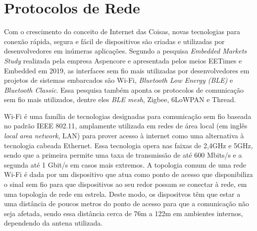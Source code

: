 \documentclass[../monografia.tex]{subfiles}
\begin{document}


\section{Protocolos de Rede} 

Com o crescimento do conceito de Internet das Coisas, novas tecnologias para conexão rápida, segura e fácil de dispositivos são criadas e utilizadas por desenvolvedores em inúmeras aplicações. Segundo a pesquisa \textit{Embedded Markets Study} realizada pela empresa Aspencore\cite{embedded-market-study} e apresentada pelos meios EETimes\cite{eetimes} e Embedded\cite{embedded} em 2019, as interfaces sem fio mais utilizadas por desenvolvedores em  projetos de sistemas embarcados são Wi-Fi, \textit{Bluetooth Low Energy (BLE)} e \textit{Bluetooth Classic}. Essa pesquisa também aponta os protocolos de comunicação sem fio mais utilizados, dentre eles \textit{BLE mesh}, Zigbee, 6LoWPAN e Thread. 

Wi-Fi é uma família de tecnologias designadas para comunicação sem fio baseada no padrão IEEE 802.11\cite{802.11}, amplamente utilizada em redes de área local (em inglês \textit{local area network}, LAN) para prover acesso à internet como uma alternativa à tecnologia cabeada Ethernet. Essa tecnologia opera nas faixas de 2,4GHz e 5GHz, sendo que a primeira permite uma taxa de transmissão de até 600 Mbits/s e a segunda até 1 Gbit/s em casos mais extremos\cite{Wi-Fi-datarate}. A topologia comum de uma rede Wi-Fi é dada por um  dispositivo que atua como ponto de acesso que disponibiliza o sinal sem fio para que dispositivos ao seu redor possam se conectar à rede, em uma topologia de rede em estrela. Deste modo, os dispositvos têm que estar a uma distância de poucos metros do ponto de acesso para que a comunicação não seja afetada, sendo essa distância cerca de 76m a 122m em ambientes internos\cite{wifi-range}, dependendo da antena utilizada.
\end{document}
